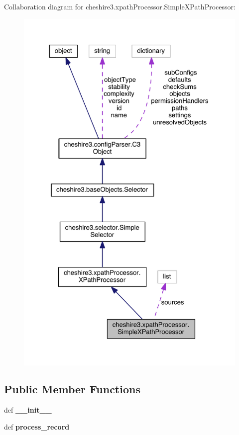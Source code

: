 Collaboration diagram for cheshire3.\-xpath\-Processor.\-Simple\-X\-Path\-Processor\-:
\nopagebreak
\begin{figure}[H]
\begin{center}
\leavevmode
\includegraphics[width=325pt]{classcheshire3_1_1xpath_processor_1_1_simple_x_path_processor__coll__graph}
\end{center}
\end{figure}
\subsection*{Public Member Functions}
\begin{DoxyCompactItemize}
\item 
\hypertarget{classcheshire3_1_1xpath_processor_1_1_simple_x_path_processor_a732f5d56b5480394cb248c636f31ddad}{def {\bfseries \-\_\-\-\_\-init\-\_\-\-\_\-}}\label{classcheshire3_1_1xpath_processor_1_1_simple_x_path_processor_a732f5d56b5480394cb248c636f31ddad}

\item 
\hypertarget{classcheshire3_1_1xpath_processor_1_1_simple_x_path_processor_af9e4060e834d58c5d061c6b43f70e44a}{def {\bfseries process\-\_\-record}}\label{classcheshire3_1_1xpath_processor_1_1_simple_x_path_processor_af9e4060e834d58c5d061c6b43f70e44a}

\end{DoxyCompactItemize}
